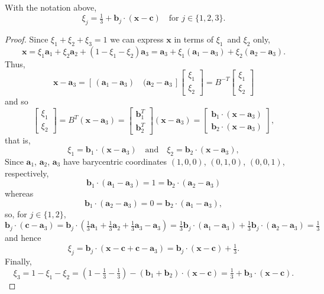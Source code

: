 \begin{theorem}\label{thm: barycentric}
With the notation above,
\[
\xi_j=\tfrac13+\boldsymbol{b}_j\cdot(\boldsymbol{x}-\boldsymbol{c})
\quad\text{for $j\in\{1,2,3\}$.}
\]
\end{theorem}
\begin{proof}
Since $\xi_1+\xi_2+\xi_3=1$ we can express $\boldsymbol{x}$ in terms of 
$\xi_1$~and $\xi_2$ only,
\[
\boldsymbol{x}=\xi_1\boldsymbol{a}_1+\xi_2\boldsymbol{a}_2
    +(1-\xi_1-\xi_2)\boldsymbol{a}_3
    =\boldsymbol{a}_3+\xi_1(\boldsymbol{a}_1-\boldsymbol{a}_3)
    +\xi_2(\boldsymbol{a}_2-\boldsymbol{a}_3).
\]
Thus,
\[
\boldsymbol{x}-\boldsymbol{a}_3
=[\,(\boldsymbol{a}_1-\boldsymbol{a}_3)\quad
    (\boldsymbol{a}_2-\boldsymbol{a}_3\,]
\begin{bmatrix}\xi_1\\ \xi_2 \end{bmatrix}
=B^{-T}\begin{bmatrix}\xi_1\\ \xi_2 \end{bmatrix}
\]
and so
\[
\begin{bmatrix}\xi_1\\ \xi_2 \end{bmatrix}=B^T(\boldsymbol{x}-\boldsymbol{a}_3)
=\begin{bmatrix}\boldsymbol{b}_1^T\\ \boldsymbol{b}_2^T\end{bmatrix}
    (\boldsymbol{x}-\boldsymbol{a}_3)
=\begin{bmatrix}\boldsymbol{b}_1\cdot(\boldsymbol{x}-\boldsymbol{a}_3)\\
\boldsymbol{b}_2\cdot(\boldsymbol{x}-\boldsymbol{a}_3)\end{bmatrix},
\]
that is,
\[
\xi_1=\boldsymbol{b}_1\cdot(\boldsymbol{x}-\boldsymbol{a}_3)
\quad\text{and}\quad
\xi_2=\boldsymbol{b}_2\cdot(\boldsymbol{x}-\boldsymbol{a}_3),
\]
Since $\boldsymbol{a}_1$, $\boldsymbol{a}_2$, $\boldsymbol{a}_3$ have
barycentric coordinates $(1,0,0)$, $(0,1,0)$, $(0,0,1)$, respectively,
\[
\boldsymbol{b}_1\cdot(\boldsymbol{a}_1-\boldsymbol{a}_3)
=1=\boldsymbol{b}_2\cdot(\boldsymbol{a}_2-\boldsymbol{a}_3)
\]
whereas
\[
\boldsymbol{b}_1\cdot(\boldsymbol{a}_2-\boldsymbol{a}_3)
=0=\boldsymbol{b}_2\cdot(\boldsymbol{a}_1-\boldsymbol{a}_3),
\]
so, for $j\in\{1,2\}$,
\[
\boldsymbol{b}_j\cdot(\boldsymbol{c}-\boldsymbol{a}_3)
    =\boldsymbol{b}_j\cdot(
\tfrac13\boldsymbol{a}_1+\tfrac13\boldsymbol{a}_2+\tfrac13\boldsymbol{a}_3
    -\boldsymbol{a}_3)
    =\tfrac13\boldsymbol{b}_j\cdot(\boldsymbol{a}_1-\boldsymbol{a}_3)
    +\tfrac13\boldsymbol{b}_j\cdot(\boldsymbol{a}_2-\boldsymbol{a}_3)
    =\tfrac13
\]
and hence
\[
\xi_j=\boldsymbol{b}_j\cdot(
    \boldsymbol{x}-\boldsymbol{c}+\boldsymbol{c}-\boldsymbol{a}_3)
    =\boldsymbol{b}_j\cdot(\boldsymbol{x}-\boldsymbol{c})+\tfrac13.
\]
Finally,
\[
\xi_3=1-\xi_1-\xi_2=(1-\tfrac13-\tfrac13)
    -(\boldsymbol{b}_1+\boldsymbol{b}_2)\cdot
    (\boldsymbol{x}-\boldsymbol{c})
    =\tfrac13+\boldsymbol{b}_3\cdot(\boldsymbol{x}-\boldsymbol{c}).
\]
\end{proof}


